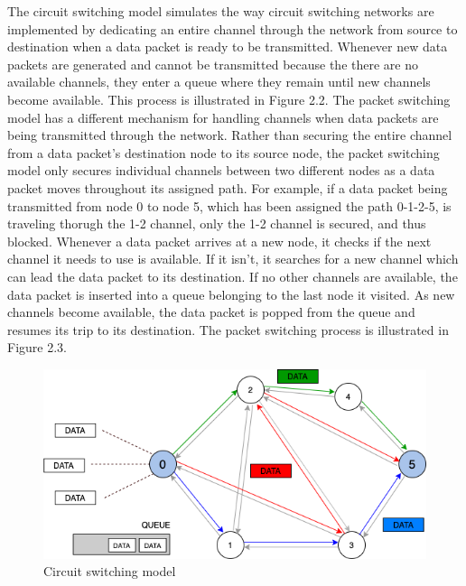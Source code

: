 \documentclass{article}
\begin{document}
  The circuit switching model simulates the way circuit switching networks are implemented by dedicating an entire channel
  through the network from source to destination when a data packet is ready to be transmitted. Whenever new data packets are generated and cannot be transmitted
  because the there are no available channels, they enter a queue where they remain until new channels become available. This
  process is illustrated in Figure 2.2. The packet switching model has a different mechanism for handling channels when data packets
  are being transmitted through the network. Rather than securing the entire channel from a data packet's destination node to its
  source node, the packet switching model only secures individual channels between two different nodes as a data packet moves throughout its
  assigned path. For example, if a data packet being transmitted from node 0 to node 5, which has been assigned the path 0-1-2-5, is
  traveling thorugh the 1-2 channel, only the 1-2 channel is secured, and thus blocked. Whenever a data packet arrives at a new node,
  it checks if the next channel it needs to use is available. If it isn't, it searches for a new channel which can lead the data packet
  to its destination. If no other channels are available, the data packet is inserted into a queue belonging to the last node it
  visited. As new channels become available, the data packet is popped from the queue and resumes its trip to its destination. The
  packet switching process is illustrated in Figure 2.3.

    \begin{figure}[h]
  \centering
          \includegraphics[totalheight=5.5cm]{images/graph_cs.png}
  \renewcommand\figurename{Figure}
      \caption{Circuit switching model}
      \label{fig:graph_cs}
  \end{figure}
\end{document}
